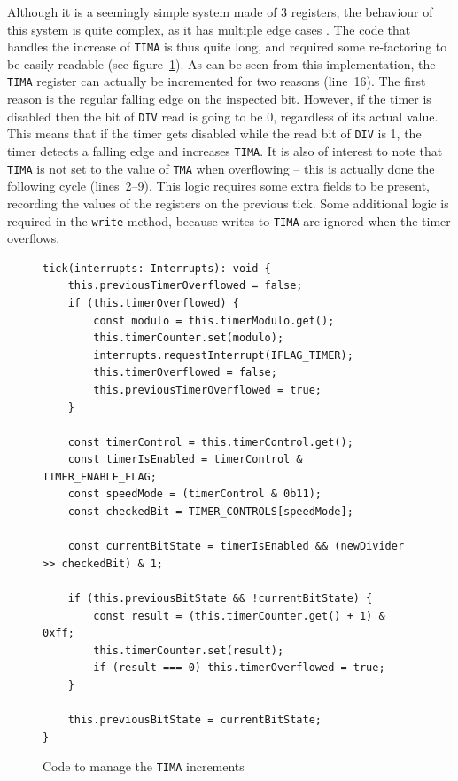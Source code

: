 \documentclass[11pt]{informatics-report}
\begin{document}
Although it is a seemingly simple system made of 3 registers, the behaviour of this system is quite complex, as it has multiple edge cases \cite[Timer obscure behaviour]{pandoc}. The code that handles the increase of \texttt{TIMA} is thus quite long, and required some re-factoring to be easily readable (see figure~\ref{fig:tima-increase}). As can be seen from this implementation, the \texttt{TIMA} register can actually be incremented for two reasons (line~16). The first reason is the regular falling edge on the inspected bit. However, if the timer is disabled then the bit of \texttt{DIV} read is going to be 0, regardless of its actual value. This means that if the timer gets disabled while the read bit of \texttt{DIV} is 1, the timer detects a falling edge and increases \texttt{TIMA}. It is also of interest to note that \texttt{TIMA} is not set to the value of \texttt{TMA} when overflowing -- this is actually done the following cycle (lines~2--9). This logic requires some extra fields to be present, recording the values of the registers on the previous tick. Some additional logic is required in the \texttt{write} method, because writes to \texttt{TIMA} are ignored when the timer overflows.

\begin{figure}[h]
    \begin{verbatim}
tick(interrupts: Interrupts): void {
    this.previousTimerOverflowed = false;
	if (this.timerOverflowed) {
        const modulo = this.timerModulo.get();
        this.timerCounter.set(modulo);
        interrupts.requestInterrupt(IFLAG_TIMER);
        this.timerOverflowed = false;
        this.previousTimerOverflowed = true;
    }

    const timerControl = this.timerControl.get();
    const timerIsEnabled = timerControl & TIMER_ENABLE_FLAG;
    const speedMode = (timerControl & 0b11);
    const checkedBit = TIMER_CONTROLS[speedMode];

    const currentBitState = timerIsEnabled && (newDivider >> checkedBit) & 1;

    if (this.previousBitState && !currentBitState) {
        const result = (this.timerCounter.get() + 1) & 0xff;
        this.timerCounter.set(result);
        if (result === 0) this.timerOverflowed = true;
    }

    this.previousBitState = currentBitState;
}
    \end{verbatim}
    \caption{Code to manage the \texttt{TIMA} increments}
    \label{fig:tima-increase}
\end{figure}
\end{document}
